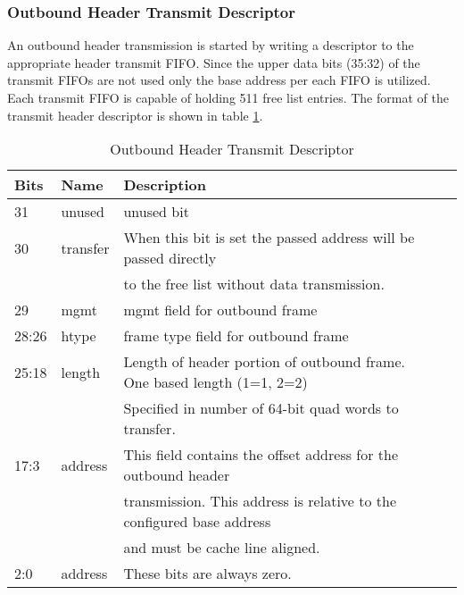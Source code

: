 \documentclass[11pt]{article}
\begin{document}
\subsubsection{Outbound Header Transmit Descriptor}
\label{subsec:ob_tx_desc}

An outbound header transmission is started by writing a descriptor to the appropriate header transmit FIFO. 
Since the upper data bits (35:32) of the transmit FIFOs are not used only the base address per each FIFO is utilized. 
Each transmit FIFO is capable of holding 511 free list entries. 
The format of the transmit header descriptor is shown in table \ref{tab:ob_tx_desc}.

\begin{table}[H]
\small
\centering
   \begin{tabular}{| l | l | l | l | l | } 
      \hline \textbf{Bits} & \textbf{Name} & \textbf{Description} \\
      \hline 31            & unused        & unused bit                                                           \\
      \hline 30            & transfer      & When this bit is set the passed address will be passed directly      \\
                           &               & to the free list without data transmission.                          \\
      \hline 29            & mgmt          & mgmt field for outbound frame                                        \\ 
      \hline 28:26         & htype         & frame type field for outbound frame                                  \\
      \hline 25:18         & length        & Length of header portion of outbound frame. One based length (1=1, 2=2) \\
                           &               & Specified in number of 64-bit quad words to transfer.                \\
      \hline 17:3          & address       & This field contains the offset address for the outbound header       \\
                           &               & transmission. This address is relative to the configured base address  \\
                           &               & and must be cache line aligned.                                        \\
      \hline 2:0           & address       & These bits are always zero.                                            \\
      \hline
   \end{tabular}
   \caption{Outbound Header Transmit Descriptor}
   \label{tab:ob_tx_desc}
\end{table}
\end{document}
